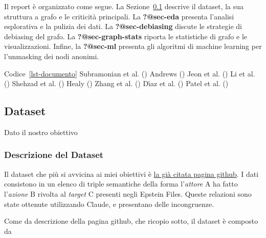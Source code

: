 \documentclass[
  italian,
  a4paper,
]{article}
\begin{document}
Il report è organizzato come segue. La Sezione~\ref{sec-dataset}
descrive il dataset, la sua struttura a grafo e le criticità principali.
La \textbf{?@sec-eda} presenta l'analisi esplorativa e la pulizia dei
dati. La \textbf{?@sec-debiasing} discute le strategie di debiasing del
grafo. La \textbf{?@sec-graph-stats} riporta le statistiche di grafo e
le visualizzazioni. Infine, la \textbf{?@sec-ml} presenta gli algoritmi
di machine learning per l'unmasking dei nodi anonimi.

Codice~\ref{lst-documento} Subramonian et al.
() Andrews
() {Jeon et al.}
() Li et al.
() Shehzad et al.
() Healy
() Zhang et al.
() Dı́az et al.
() Patel et al.
()

\subsection{Dataset}\label{sec-dataset}

Dato il nostro obiettivo

\subsubsection{Descrizione del Dataset}\label{soc-datadescr}

Il dataset che più si avvicina ai miei obiettivi è
\href{https://github.com/maxandrews/Epstein-doc-explorer}{la già citata
pagina github}. I dati consistono in un elenco di triple semantiche
della forma l'\emph{attore} A ha fatto l'\emph{azione} B rivolta al
\emph{target} C presenti negli Epstein Files. Queste relazioni sono
state ottenute utilizzando Claude, e presentano delle incongruenze.

Come da descrizione della pagina github, che ricopio sotto, il dataset è
composto da
\end{document}
